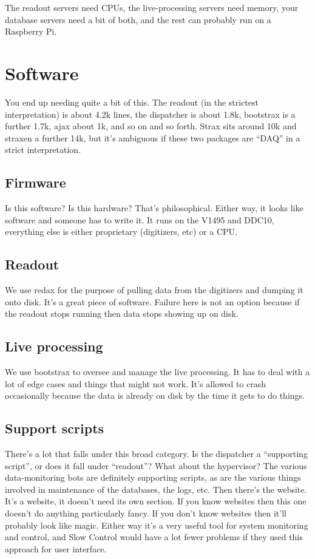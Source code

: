 The readout servers need CPUs, the live-processing servers need memory, your database servers need a bit of both, and the rest can probably run on a Raspberry Pi.

\section{Software}

You end up needing quite a bit of this.
The readout (in the strictest interpretation) is about 4.2k lines, the dispatcher is about 1.8k, bootstrax is a further 1.7k, ajax about 1k, and so on and so forth.
Strax sits around 10k and straxen a further 14k, but it's ambiguous if these two packages are ``DAQ'' in a strict interpretation.

\subsection{Firmware}

Is this software?
Is this hardware?
That's philosophical.
Either way, it looks like software and someone has to write it.
It runs on the V1495 and DDC10, everything else is either proprietary (digitizers, etc) or a CPU.

\subsection{Readout}

We use redax for the purpose of pulling data from the digitizers and dumping it onto disk.
It's a great piece of software.
Failure here is not an option because if the readout stops running then data stops showing up on disk.

\subsection{Live processing}

We use bootstrax to oversee and manage the live processing.
It has to deal with a lot of edge cases and things that might not work.
It's allowed to crash occasionally because the data is already on disk by the time it gets to do things.

\subsection{Support scripts}

There's a lot that falls under this broad category.
Is the dispatcher a ``supporting script'', or does it fall under ``readout''?
What about the hypervisor?
The various data-monitoring bots are definitely supporting scripts, as are the various things involved in maintenance of the databases, the logs, etc.
Then there's the website.
It's a website, it doesn't need its own section.
If you know websites then this one doesn't do anything particularly fancy.
If you don't know websites then it'll probably look like magic.
Either way it's a very useful tool for system monitoring and control, and Slow Control would have a lot fewer problems if they used this approach for user interface.
